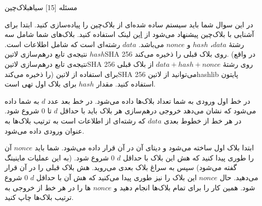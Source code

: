 ‌مسئله [15]
‌سیاه{بلاک‌چین}

در این سوال شما باید سیستم ساده شده‌ای از بلاک‌چین را پیاده‌سازی کنید. ابتدا برای آشنایی با بلاک‌چین پیشنهاد می‌شود از 
\href{https://blog.goodaudience.com/blockchain-for-beginners-what-is-blockchain-519db8c6677a}{این}
لینک استفاده کنید. 
بلاک‌های شما شامل سه رشتۀ $data$، $hash$ و $nonce$ می‌باشد. $data$ رشته‌ای است که شامل اطلاعات است. $hash$ نتیجه‌ی تابع درهم‌سازی ‌لاتین{SHA 256} روی بلاک قبلی را ذخیره می‌کند. (در واقع نتیجه‌ی تابع درهم‌سازی ‌لاتین{SHA 256} روی رشتۀ $data+hash+nonce$ از بلاک قبلی را ذخیره می‌کند) برای استفاده از ‌لاتین{SHA 256} می‌توانید از ‌لاتین{hashlib} پایتون استفاده کنید. مقدار $hash$ برای بلاک اول تهی است.

 در خط اول ورودی به شما تعداد بلاک‌ها داده می‌شود. در خط بعد عدد $d$ به شما داده می‌شود که نشان می‌دهد خروجی درهم‌سازی هر بلاک باید با حداقل $d$ تا $0$ شروع شود. در هر خط از خطوط بعدی $data$ که رشته‌ای از اطلاعات است به ترتیب بلاک‌ها به عنوان ورودی داده می‌شود.
 
  ابتدا بلاک اول ساخته می‌شود و دیتای آن در آن قرار داده می‌شود. شما باید $nonce$ آن را طوری پیدا کنید که هش این بلاک با حداقل $d$ $0$ شروع شود. (به این عملیات ماینینگ گفته می‌شود) سپس به سراغ بلاک بعدی می‌روید. هش بلاک قبلی را در آن قرار می‌دهید. حال $nonce$ این بلاک را نیز طوری پیدا می‌کنید که هش آن با حداقل $d$ $0$ شروع شود. همین کار را برای تمام بلاک‌ها انجام دهید و $nonce$ ها را در هر خط از خروجی به ترتیب بلاک‌ها چاپ کنید.










